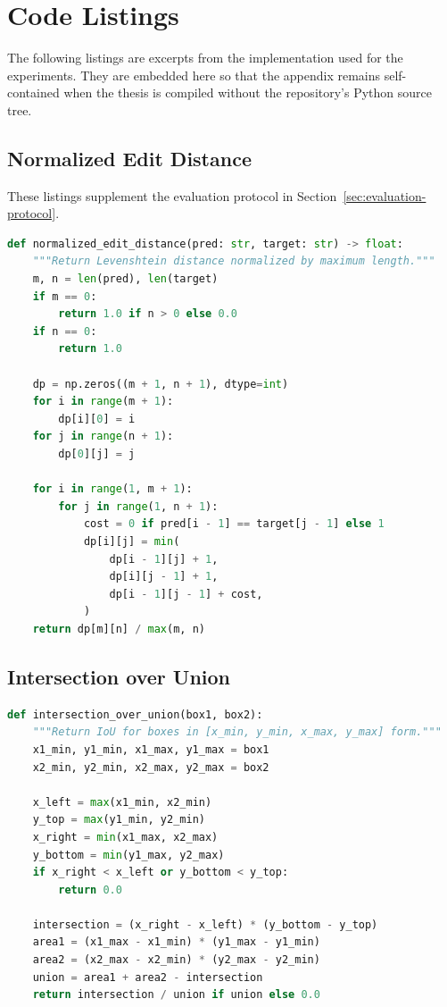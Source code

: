 \chapter{Code Listings}
\label{app:code}

The following listings are excerpts from the implementation used for the
experiments. They are embedded here so that the appendix remains self-contained
when the thesis is compiled without the repository's Python source tree.

\section{Normalized Edit Distance}
\label{app:metrics}

These listings supplement the evaluation protocol in
Section~\ref{sec:evaluation-protocol}.

\begin{lstlisting}[language=Python,
  basicstyle=\ttfamily\fontsize{7.5}{8.6}\selectfont,
  aboveskip=0.25\baselineskip,
  xleftmargin=22pt,
  framexleftmargin=19pt,
  numbersep=6pt,
  caption={Normalized Edit Distance implementation from \texttt{metrics.py}}]
def normalized_edit_distance(pred: str, target: str) -> float:
    """Return Levenshtein distance normalized by maximum length."""
    m, n = len(pred), len(target)
    if m == 0:
        return 1.0 if n > 0 else 0.0
    if n == 0:
        return 1.0

    dp = np.zeros((m + 1, n + 1), dtype=int)
    for i in range(m + 1):
        dp[i][0] = i
    for j in range(n + 1):
        dp[0][j] = j

    for i in range(1, m + 1):
        for j in range(1, n + 1):
            cost = 0 if pred[i - 1] == target[j - 1] else 1
            dp[i][j] = min(
                dp[i - 1][j] + 1,
                dp[i][j - 1] + 1,
                dp[i - 1][j - 1] + cost,
            )
    return dp[m][n] / max(m, n)
\end{lstlisting}

\section{Intersection over Union}

\begin{lstlisting}[language=Python,
  xleftmargin=22pt,
  framexleftmargin=19pt,
  numbersep=6pt,
  caption={Intersection over Union implementation from \texttt{metrics.py}}]
def intersection_over_union(box1, box2):
    """Return IoU for boxes in [x_min, y_min, x_max, y_max] form."""
    x1_min, y1_min, x1_max, y1_max = box1
    x2_min, y2_min, x2_max, y2_max = box2

    x_left = max(x1_min, x2_min)
    y_top = max(y1_min, y2_min)
    x_right = min(x1_max, x2_max)
    y_bottom = min(y1_max, y2_max)
    if x_right < x_left or y_bottom < y_top:
        return 0.0

    intersection = (x_right - x_left) * (y_bottom - y_top)
    area1 = (x1_max - x1_min) * (y1_max - y1_min)
    area2 = (x2_max - x2_min) * (y2_max - y2_min)
    union = area1 + area2 - intersection
    return intersection / union if union else 0.0
\end{lstlisting}

